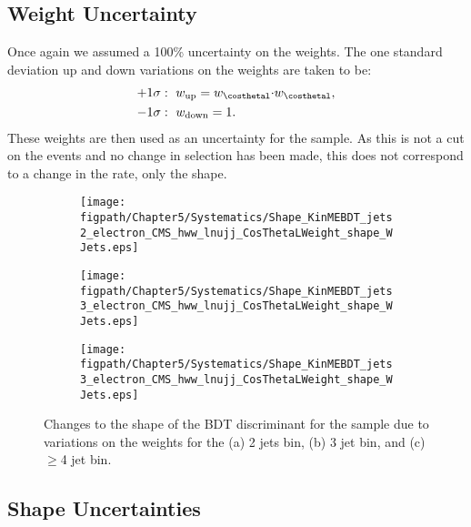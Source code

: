 \subsection{\texorpdfstring{\costhetal}{CosThetaL} Weight Uncertainty}

Once again we assumed a 100\% uncertainty on the \costhetal weights.
The one standard deviation up and down variations on the weights are taken to be:
\begin{align}
  +1\sigma: {}& ~w_{\text{up}}=w_{\costhetal}{\cdot}w_{\costhetal}, \\
  -1\sigma: {}& ~w_{\text{down}}=1.
\end{align}
These weights are then used as an uncertainty for the \Wjets sample.
As this is not a cut on the events and no change in selection has been made, this does not correspond to a change in the rate, only the \Wjets shape.

\begin{figure}[!hbt]
    \centering
    \begin{subfigure}[t]{0.31\textwidth}
        \texttt{[image: \\figpath/Chapter5/Systematics/Shape\_KinMEBDT\_jets2\_electron\_CMS\_hww\_lnujj\_CosThetaLWeight\_shape\_WJets.eps]}
        \caption{}
        \label{fig:costhetal_uncertainty_jets2}
    \end{subfigure}
    \begin{subfigure}[t]{0.31\textwidth}
        \texttt{[image: \\figpath/Chapter5/Systematics/Shape\_KinMEBDT\_jets3\_electron\_CMS\_hww\_lnujj\_CosThetaLWeight\_shape\_WJets.eps]}
        \caption{}
        \label{fig:costhetal_uncertainty_jets3}
    \end{subfigure}
    \begin{subfigure}[t]{0.31\textwidth}
        \texttt{[image: \\figpath/Chapter5/Systematics/Shape\_KinMEBDT\_jets3\_electron\_CMS\_hww\_lnujj\_CosThetaLWeight\_shape\_WJets.eps]}
        \caption{}
        \label{fig:costhetal_uncertainty_jets4}
    \end{subfigure}
    \caption{Changes to the shape of the BDT discriminant for the \Wjets sample due to variations on the \costhetal weights for the (a) 2 jets bin, (b) 3 jet bin, and (c) $\geqslant$4 jet bin.}
    \label{fig:costhetal_uncertainty}
\end{figure}

\subsection{\Wjets Shape Uncertainties}

